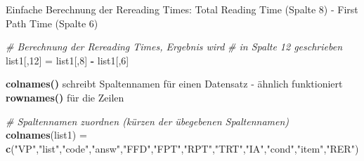 \documentclass[]{book}
\newenvironment{Shaded}{\begin{snugshade}}{\end{snugshade}}
\newcommand{\KeywordTok}[1]{\textcolor[rgb]{0.13,0.29,0.53}{\textbf{#1}}}
\newcommand{\DecValTok}[1]{\textcolor[rgb]{0.00,0.00,0.81}{#1}}
\newcommand{\StringTok}[1]{\textcolor[rgb]{0.31,0.60,0.02}{#1}}
\newcommand{\CommentTok}[1]{\textcolor[rgb]{0.56,0.35,0.01}{\textit{#1}}}
\newcommand{\OperatorTok}[1]{\textcolor[rgb]{0.81,0.36,0.00}{\textbf{#1}}}
\newcommand{\NormalTok}[1]{#1}
\begin{document}
\begin{Shaded}
\end{Shaded}

Einfache Berechnung der Rereading Times: Total Reading Time (Spalte 8) -
First Path Time (Spalte 6)

\begin{Shaded}
\begin{Highlighting}[]
\CommentTok{# Berechnung der Rereading Times, Ergebnis wird }
\CommentTok{# in Spalte 12 geschrieben}
\NormalTok{list1[,}\DecValTok{12}\NormalTok{] =}\StringTok{ }\NormalTok{list1[,}\DecValTok{8}\NormalTok{] }\OperatorTok{-}\StringTok{ }\NormalTok{list1[,}\DecValTok{6}\NormalTok{]}
\end{Highlighting}
\end{Shaded}

\textbf{colnames()} schreibt Spaltennamen für einen Datensatz - ähnlich
funktioniert \textbf{rownames()} für die Zeilen

\begin{Shaded}
\begin{Highlighting}[]
\CommentTok{# Spaltennamen zuordnen (kürzen der übegebenen Spaltennamen)}
\KeywordTok{colnames}\NormalTok{(list1) =}\StringTok{ }\KeywordTok{c}\NormalTok{(}\StringTok{"VP"}\NormalTok{,}\StringTok{"list"}\NormalTok{,}\StringTok{"code"}\NormalTok{,}\StringTok{"answ"}\NormalTok{,}\StringTok{"FFD"}\NormalTok{,}\StringTok{"FPT"}\NormalTok{,}\StringTok{"RPT"}\NormalTok{,}\StringTok{"TRT"}\NormalTok{,}\StringTok{"IA"}\NormalTok{,}\StringTok{"cond"}\NormalTok{,}\StringTok{"item"}\NormalTok{,}\StringTok{"RER"}\NormalTok{)}
\end{Highlighting}
\end{Shaded}
\end{document}
